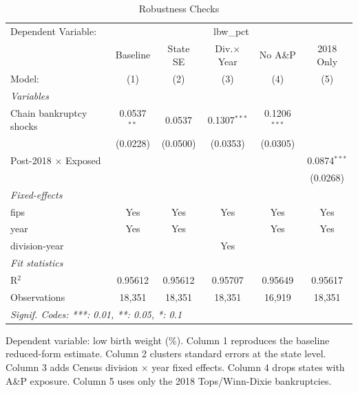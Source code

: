 
\begin{table}[htbp]
   \caption{\label{tab:robust} Robustness Checks}
   \centering
   \begin{tabular}{lccccc}
      \tabularnewline \midrule \midrule
      Dependent Variable: & \multicolumn{5}{c}{lbw\_pct}\\
                                  & Baseline      & State SE & Div.$\times$Year  & No A\&P        & 2018 Only \\   
      Model:                      & (1)           & (2)      & (3)               & (4)            & (5)\\  
      \midrule
      \emph{Variables}\\
      Chain bankruptcy shocks     & 0.0537$^{**}$ & 0.0537   & 0.1307$^{***}$    & 0.1206$^{***}$ &   \\   
                                  & (0.0228)      & (0.0500) & (0.0353)          & (0.0305)       &   \\   
      Post-2018 $\times$ Exposed  &               &          &                   &                & 0.0874$^{***}$\\   
                                  &               &          &                   &                & (0.0268)\\   
      \midrule
      \emph{Fixed-effects}\\
      fips                        & Yes           & Yes      & Yes               & Yes            & Yes\\  
      year                        & Yes           & Yes      &                   & Yes            & Yes\\  
      division-year               &               &          & Yes               &                & \\  
      \midrule
      \emph{Fit statistics}\\
      R$^2$                       & 0.95612       & 0.95612  & 0.95707           & 0.95649        & 0.95617\\  
      Observations                & 18,351        & 18,351   & 18,351            & 16,919         & 18,351\\  
      \midrule \midrule
      \multicolumn{6}{l}{\emph{Signif. Codes: ***: 0.01, **: 0.05, *: 0.1}}\\
   \end{tabular}
   
   \par \raggedright 
   Dependent variable: low birth weight (\%). Column 1 reproduces the baseline reduced-form estimate. Column 2 clusters standard errors at the state level. Column 3 adds Census division $\times$ year fixed effects. Column 4 drops states with A\&P exposure. Column 5 uses only the 2018 Tops/Winn-Dixie bankruptcies.
\end{table}


